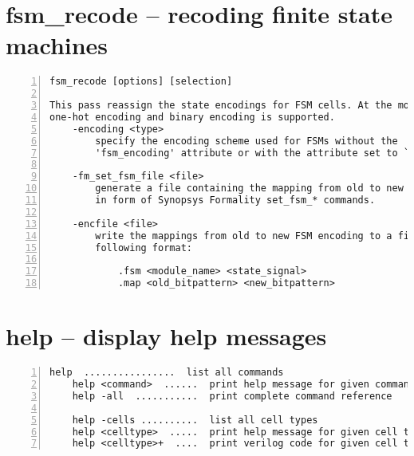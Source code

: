 \section{fsm\_recode -- recoding finite state machines}
\label{cmd:fsm_recode}
\begin{lstlisting}[numbers=left,frame=single]
    fsm_recode [options] [selection]

This pass reassign the state encodings for FSM cells. At the moment only
one-hot encoding and binary encoding is supported.
    -encoding <type>
        specify the encoding scheme used for FSMs without the
        'fsm_encoding' attribute or with the attribute set to `auto'.

    -fm_set_fsm_file <file>
        generate a file containing the mapping from old to new FSM encoding
        in form of Synopsys Formality set_fsm_* commands.

    -encfile <file>
        write the mappings from old to new FSM encoding to a file in the
        following format:

            .fsm <module_name> <state_signal>
            .map <old_bitpattern> <new_bitpattern>
\end{lstlisting}

\section{help -- display help messages}
\label{cmd:help}
\begin{lstlisting}[numbers=left,frame=single]
    help  ................  list all commands
    help <command>  ......  print help message for given command
    help -all  ...........  print complete command reference

    help -cells ..........  list all cell types
    help <celltype>  .....  print help message for given cell type
    help <celltype>+  ....  print verilog code for given cell type
\end{lstlisting}

